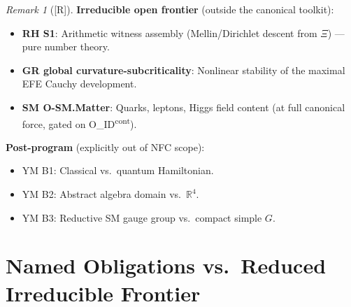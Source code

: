 \documentclass[12pt,oneside]{amsbook}
\theoremstyle{plain}
\theoremstyle{definition}
\theoremstyle{remark}
\newtheorem{remark}[theorem]{Remark}
\newcommand{\status}[1]{\textup{[#1]}}
\begin{document}
\begin{remark}[\status{R}]
\textbf{Irreducible open frontier} (outside the canonical toolkit):
\begin{itemize}
  \item \textbf{RH S1}: Arithmetic witness assembly (Mellin/Dirichlet
    descent from $\Xi$) --- pure number theory.
  \item \textbf{GR global curvature-subcriticality}: Nonlinear
    stability of the maximal EFE Cauchy development.
  \item \textbf{SM O-SM.Matter}: Quarks, leptons, Higgs field content
    (at full canonical force, gated on O\_ID\textsuperscript{cont}).
\end{itemize}

\textbf{Post-program} (explicitly out of NFC scope):
\begin{itemize}
  \item YM B1: Classical vs.\ quantum Hamiltonian.
  \item YM B2: Abstract algebra domain vs.\ $\mathbb{R}^4$.
  \item YM B3: Reductive SM gauge group vs.\ compact simple $G$.
\end{itemize}
\end{remark}



\section{Named Obligations vs.\ Reduced Irreducible Frontier}
\label{sec:obligation-vs-frontier}
\end{document}
